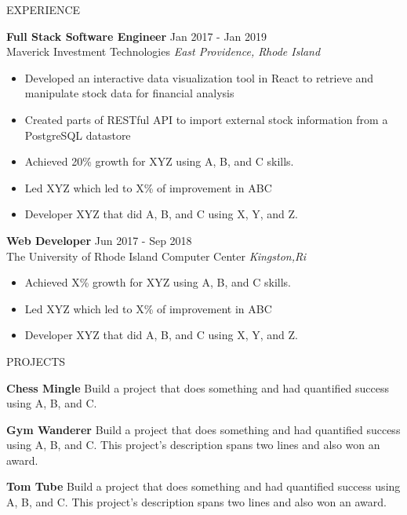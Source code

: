 \documentclass{resume} %
\begin{document}
\begin{rSection}{EXPERIENCE}

\textbf{Full Stack Software Engineer} \hfill Jan 2017 - Jan 2019\\
Maverick Investment Technologies \hfill \textit{East Providence, Rhode Island}
 \begin{itemize}
    \itemsep -3pt {} 
    \item Developed an interactive data visualization tool in React to retrieve and manipulate stock data for financial analysis
    
    \item Created parts of RESTful API to import external stock information from a PostgreSQL datastore 
     \item Achieved 20\% growth for XYZ using A, B, and C skills.
     \item Led XYZ which led to X\% of improvement in ABC
    \item Developer XYZ that did A, B, and C using X, Y, and Z. 
 \end{itemize}
 
\textbf{Web Developer} \hfill  Jun 2017 - Sep 2018\\
The University of Rhode Island Computer Center \hfill \textit{Kingston,Ri}
 \begin{itemize}
    \itemsep -3pt {} 
     \item Achieved X\% growth for XYZ using A, B, and C skills.
     \item Led XYZ which led to X\% of improvement in ABC
    \item Developer XYZ that did A, B, and C using X, Y, and Z. 
 \end{itemize}

\end{rSection} 


\begin{rSection}{PROJECTS}
\vspace{-1.25em}
\item \textbf{Chess Mingle} {Build a project that does something and had quantified success using A, B, and C.}
\item \textbf{Gym Wanderer} {Build a project that does something and had quantified success using A, B, and C. This project's description spans two lines and also won an award.}
\item \textbf{Tom Tube} {Build a project that does something and had quantified success using A, B, and C. This project's description spans two lines and also won an award.}
\end{rSection} 
\end{document}
